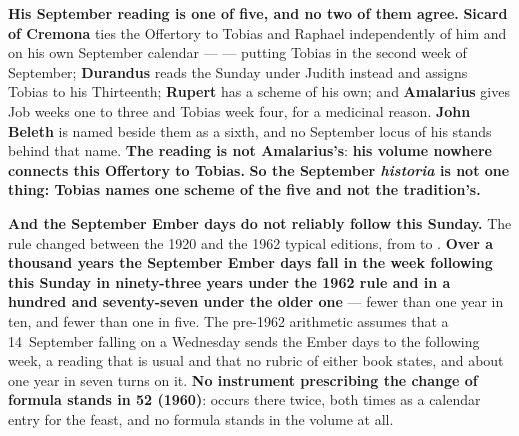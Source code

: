 \textbf{His September reading is one of five, and no two of them agree.}
\textbf{Sicard of Cremona} ties the Offertory to Tobias and Raphael
independently of him and on his own September calendar ---  --- putting Tobias in the second week of September;
\textbf{Durandus} reads the Sunday under Judith instead and assigns Tobias to
his Thirteenth; \textbf{Rupert} has a scheme of his own; and
\textbf{Amalarius} gives Job
weeks one to three and Tobias week four, for a medicinal reason. \textbf{John
Beleth} is named beside them as a sixth, and no September locus of his
 stands behind that name. \textbf{The
reading is not Amalarius's}: \textbf{his  volume nowhere
connects this Offertory to Tobias.} \textbf{So the September \emph{historia} is not one thing:
Tobias names one scheme of the five and not the tradition's.}

\textbf{And the September Ember days do not reliably follow this Sunday.} The
rule changed between the 1920 and the 1962 typical editions, from  to . \textbf{Over a thousand years the September Ember days fall in the
week following this Sunday in ninety-three years under the 1962
rule and in a hundred and seventy-seven under the older one} --- fewer than one
year in ten, and fewer than one in five. The pre-1962 arithmetic assumes that a 14~September
falling on a Wednesday sends the Ember days to the following week, a reading
that is usual and that no rubric of either book states, and about one year in
seven turns on it.
\textbf{No instrument prescribing the change of formula stands in  52 (1960)}:  occurs there twice, both
times as a calendar entry for the feast, and no  formula
stands in the volume at all.

